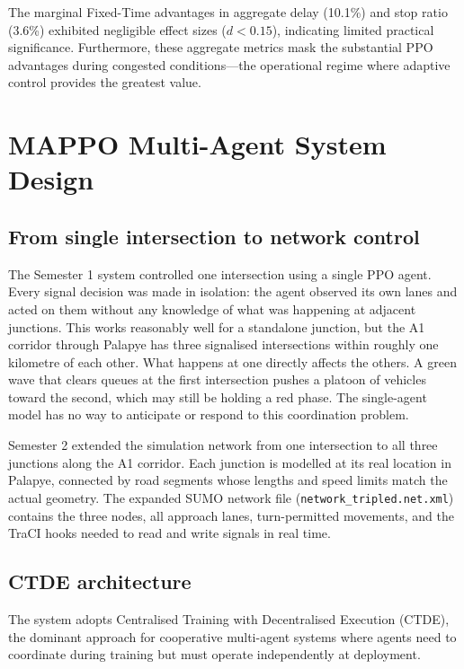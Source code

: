 \documentclass[11pt, a4paper]{report}
\begin{document}
The marginal Fixed-Time advantages in aggregate delay (10.1\%) and stop ratio (3.6\%) exhibited negligible effect sizes ($d < 0.15$), indicating limited practical significance. Furthermore, these aggregate metrics mask the substantial PPO advantages during congested conditions---the operational regime where adaptive control provides the greatest value.

\chapter{MAPPO Multi-Agent System Design}
\label{chap:mappo_system}

\section{From single intersection to network control}

The Semester 1 system controlled one intersection using a single PPO agent. Every signal decision was made in isolation: the agent observed its own lanes and acted on them without any knowledge of what was happening at adjacent junctions. This works reasonably well for a standalone junction, but the A1 corridor through Palapye has three signalised intersections within roughly one kilometre of each other. What happens at one directly affects the others. A green wave that clears queues at the first intersection pushes a platoon of vehicles toward the second, which may still be holding a red phase. The single-agent model has no way to anticipate or respond to this coordination problem.

Semester 2 extended the simulation network from one intersection to all three junctions along the A1 corridor. Each junction is modelled at its real location in Palapye, connected by road segments whose lengths and speed limits match the actual geometry. The expanded SUMO network file (\texttt{network\_tripled.net.xml}) contains the three nodes, all approach lanes, turn-permitted movements, and the TraCI hooks needed to read and write signals in real time.

\section{CTDE architecture}

The system adopts Centralised Training with Decentralised Execution (CTDE), the dominant approach for cooperative multi-agent systems where agents need to coordinate during training but must operate independently at deployment.
\end{document}
